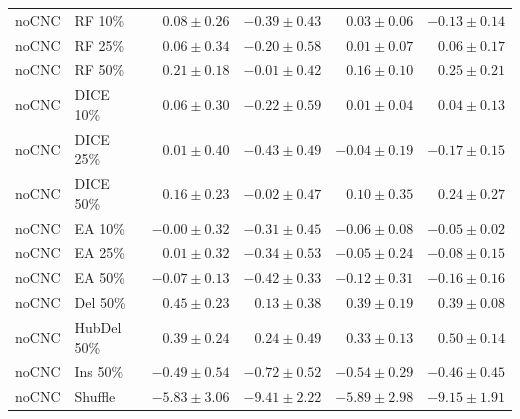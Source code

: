 {\begin{longtable}{llrrrr}
noCNC & RF 10\% & $0.08\pm0.26$ & $-0.39\pm0.43$ & $0.03\pm0.06$ & $-0.13\pm0.14$ \\
noCNC & RF 25\% & $0.06\pm0.34$ & $-0.20\pm0.58$ & $0.01\pm0.07$ & $0.06\pm0.17$ \\
noCNC & RF 50\% & $0.21\pm0.18$ & $-0.01\pm0.42$ & $0.16\pm0.10$ & $0.25\pm0.21$ \\
noCNC & DICE 10\% & $0.06\pm0.30$ & $-0.22\pm0.59$ & $0.01\pm0.04$ & $0.04\pm0.13$ \\
noCNC & DICE 25\% & $0.01\pm0.40$ & $-0.43\pm0.49$ & $-0.04\pm0.19$ & $-0.17\pm0.15$ \\
noCNC & DICE 50\% & $0.16\pm0.23$ & $-0.02\pm0.47$ & $0.10\pm0.35$ & $0.24\pm0.27$ \\
noCNC & EA 10\% & $-0.00\pm0.32$ & $-0.31\pm0.45$ & $-0.06\pm0.08$ & $-0.05\pm0.02$ \\
noCNC & EA 25\% & $0.01\pm0.32$ & $-0.34\pm0.53$ & $-0.05\pm0.24$ & $-0.08\pm0.15$ \\
noCNC & EA 50\% & $-0.07\pm0.13$ & $-0.42\pm0.33$ & $-0.12\pm0.31$ & $-0.16\pm0.16$ \\
noCNC & Del 50\% & $0.45\pm0.23$ & $0.13\pm0.38$ & $0.39\pm0.19$ & $0.39\pm0.08$ \\
noCNC & HubDel 50\% & $0.39\pm0.24$ & $0.24\pm0.49$ & $0.33\pm0.13$ & $0.50\pm0.14$ \\
noCNC & Ins 50\% & $-0.49\pm0.54$ & $-0.72\pm0.52$ & $-0.54\pm0.29$ & $-0.46\pm0.45$ \\
noCNC & Shuffle & $-5.83\pm3.06$ & $-9.41\pm2.22$ & $-5.89\pm2.98$ & $-9.15\pm1.91$ \\
\end{longtable}
}


